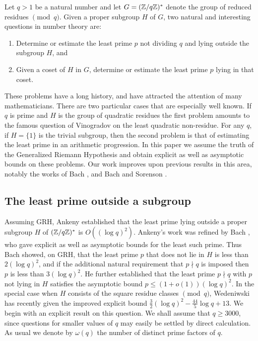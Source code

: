 \documentclass [12pt]{amsart}
\numberwithin{equation}{section}
\begin{document}
\noindent  Let $q>1$ be a natural number and let $G=({\Bbb Z}/q{\Bbb Z})^*$ denote the group 
of reduced residues $\pmod q$.  Given a proper subgroup $H$ of $G$,  
two natural and interesting questions in number theory are: 
\begin{enumerate}
\item Determine or estimate the 
least prime $p$ not dividing $q$ and lying outside the subgroup $H$, and
\item Given a 
coset of $H$ in $G$, determine or estimate the least prime $p$ lying in that coset.  
\end{enumerate}
These problems have a long history, and have attracted the attention of many 
mathematicians.  There are two particular cases that are especially well known.  If $q$ is 
prime and $H$ is the group of quadratic residues the first problem amounts to the 
famous question of Vinogradov on the least quadratic non-residue.  For any 
$q$, if  $H=\{1\}$ is the trivial subgroup, then the second problem is that 
of estimating the least prime in an arithmetic progression.   In this paper we assume the 
truth of the Generalized Riemann Hypothesis and obtain explicit as well as asymptotic bounds 
on these problems.  Our work improves upon previous results in this 
area, notably the works of Bach \cite{Bach1}, and Bach and Sorenson \cite{Bach2}.


\subsection{The least prime outside a subgroup} Assuming GRH, Ankeny 
\cite{Ankeny} established that the least prime lying outside a proper 
subgroup $H$ of $({\Bbb Z}/q{\Bbb Z})^*$ is $O((\log q)^2)$.  Ankeny's work was refined by Bach \cite{Bach1}, 
who gave explicit as well as asymptotic 
bounds for the least such prime.  Thus Bach showed, on GRH, that the least prime $p$ 
that does not lie in $H$ is less than $2 (\log q)^2$, and if  the 
additional natural requirement that $p \nmid q$ is imposed then $p$ is less than $3 (\log q)^2$.  
He further established that the least prime $p\nmid q$ with $p$ not lying 
in $H$ satisfies the asymptotic bound $p\le (1+o(1)) (\log q)^2$.   In the 
special case when $H$ consists of the square residue classes $\pmod q$, 
Wedeniwski \cite{Wed} has recently given the improved explicit bound 
$\frac{3}{2}(\log q)^2 -  \frac{44}{5} \log q + 13$.   
We begin with an explicit 
result on this question.  We shall assume that $q\ge 3000$, since questions 
for smaller values of $q$ may easily be settled by direct calculation. As usual
we denote by $\omega(q)$ the number of distinct prime factors of $q$. 
\end{document}
